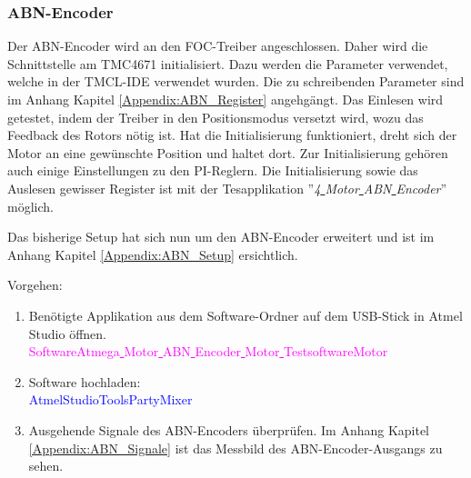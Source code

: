 \newpage
\subsubsection{ABN-Encoder}
\label{subsubsec:Inbetriebnahme_ABN-Encoder}

Der ABN-Encoder wird an den FOC-Treiber angeschlossen. Daher wird die Schnittstelle am TMC4671 initialisiert. Dazu werden die Parameter verwendet, welche in der TMCL-IDE verwendet wurden. Die zu schreibenden Parameter sind im Anhang Kapitel \ref{Appendix:ABN_Register} angehgängt. Das Einlesen wird getestet, indem der Treiber in den Positionsmodus versetzt wird, wozu das Feedback des Rotors nötig ist. Hat die Initialisierung funktioniert, dreht sich der Motor an eine gewünschte Position und haltet dort. Zur Initialisierung gehören auch einige Einstellungen zu den PI-Reglern. Die Initialisierung sowie das Auslesen gewisser Register ist mit der Tesapplikation ''\textit{4\underline{ }Motor\underline{ }ABN\underline{ }Encoder}'' möglich.

Das bisherige Setup hat sich nun um den ABN-Encoder erweitert und ist im Anhang Kapitel \ref{Appendix:ABN_Setup} ersichtlich.

Vorgehen:
\begin{enumerate}
\item Benötigte Applikation aus dem Software-Ordner auf dem USB-Stick in Atmel Studio öffnen.\\
\textcolor{magenta}{Software\textrightarrow Atmega\underline{ }Motor\underline{ }ABN\underline{ }Encoder\underline{ }Motor\underline{ }Testsoftware\textrightarrow Motor}\\

\item Software hochladen:\\
\textcolor{blue}{AtmelStudio\textrightarrow Tools\textrightarrow PartyMixer}\\


\item Ausgehende Signale des ABN-Encoders überprüfen. Im Anhang Kapitel \ref{Appendix:ABN_Signale} ist das Messbild des ABN-Encoder-Ausgangs zu sehen.

\end{enumerate}